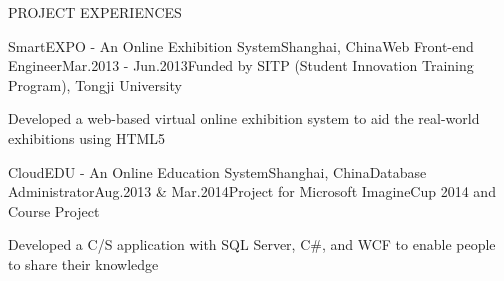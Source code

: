 \documentclass{resume} %
\begin{document}
\begin{rSection}{PROJECT EXPERIENCES}
  \begin{pSubsection}{SmartEXPO - An Online Exhibition System}{Shanghai,
    China}{Web Front-end Engineer}{Mar.2013 - Jun.2013}{Funded by SITP (Student Innovation Training Program), Tongji University}
  \item Developed a web-based virtual online exhibition system to aid the real-world exhibitions using HTML5
  \end{pSubsection}

  \begin{pSubsection}{CloudEDU - An Online Education System}{Shanghai,
  China}{Database Administrator}{Aug.2013 \& Mar.2014}{Project for Microsoft ImagineCup 2014 and Course Project}
  \item Developed a C/S application with SQL Server, C\#, and WCF to enable people to share their knowledge
  \end{pSubsection}

\end{rSection}

\end{document}
